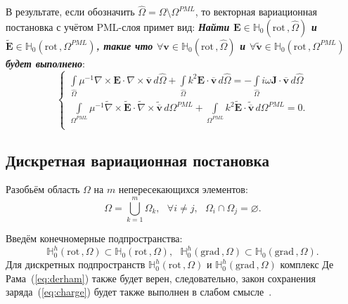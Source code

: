 \documentclass[a4paper,14pt]{article}
\begin{document}
В результате, если обозначить $\widehat{\Omega} = \Omega \setminus {\Omega^{PML}}$, то векторная вариационная постановка с учётом PML-слоя примет вид: \textbf{\textit{Найти $\mathbf{E} \in \mathbb{H}_{0}( \mathrm{rot}\,, \widehat{\Omega} )$ и  $\tilde{\mathbf{E}} \in \mathbb{H}_{0}( \mathrm{rot}\,, {\Omega^{PML}} )$, такие что $\forall \mathbf{v} \in \mathbb{H}_{0}( \mathrm{rot}\,, \widehat{\Omega} )$ и $\forall \tilde{\mathbf{v}} \in \mathbb{H}_{0}( \mathrm{rot}\,, {\Omega^{PML}} )$ будет выполнено}}:
\begin{equation*}
	\begin{cases}
		\displaystyle
		\int\limits_{\widehat{\Omega}} \mu^{-1} \nabla \times \mathbf{E} \cdot \nabla \times \overline{\mathbf{v}} \,d\widehat{\Omega} + \int\limits_{\widehat{\Omega}} k^{2} \mathbf{E} \cdot \overline{\mathbf{v}} \,d\widehat{\Omega} = - \int\limits_{\widehat{\Omega}} i \omega \mathbf{J} \cdot \overline{\mathbf{v}} \,d\widehat{\Omega} \\
		\displaystyle
		\int\limits_{{\Omega^{PML}}} \mu^{-1} \tilde{\nabla} \times \tilde{\mathbf{E}} \cdot \tilde{\nabla} \times \tilde{\overline{\mathbf{v}}} \,d{\Omega^{PML}} + \int\limits_{{\Omega^{PML}}} k^{2} \tilde{\mathbf{E}} \cdot \tilde{\overline{\mathbf{v}}} \,d{\Omega^{PML}} = 0 . \\
	\end{cases}
\end{equation*}


\subsection{Дискретная вариационная постановка}
Разобьём область $\Omega$ на $m$ непересекающихся элементов:
\begin{equation*}
	\Omega = \bigcup\limits_{k=1}^{m} \Omega_k , \text{~~} \forall i \neq j , \text{~~} \Omega_i \cap \Omega_j = \varnothing .
\end{equation*}

Введём конечномерные подпространства:
\begin{equation*}
	\mathbb{H}_{0}^h( \mathrm{rot}\,, \Omega ) \subset \mathbb{H}_{0}( \mathrm{rot}\,, \Omega ) , \text{~~}
	\mathbb{H}_{0}^h( \mathrm{grad}\,, \Omega ) \subset \mathbb{H}_{0}( \mathrm{grad}\,, \Omega ) .
\end{equation*}
Для дискретных подпространств $\mathbb{H}_{0}^h( \mathrm{rot}\,, \Omega )$ и $\mathbb{H}_{0}^h( \mathrm{grad}\,, \Omega )$ комплекс Де Рама~(\ref{eq:derham}) также будет верен, следовательно, закон сохранения заряда~(\ref{eq:charge}) будет также выполнен в слабом смысле~\citep{epov}.
\end{document}
